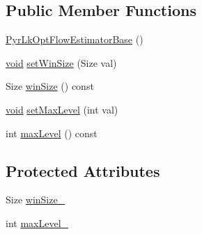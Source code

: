 \subsection*{Public Member Functions}
\begin{DoxyCompactItemize}
\item 
\hyperlink{classcv_1_1videostab_1_1PyrLkOptFlowEstimatorBase_ae6222bef78aae91f7580df19ed7217b5}{Pyr\-Lk\-Opt\-Flow\-Estimator\-Base} ()
\item 
\hyperlink{legacy_8hpp_a8bb47f092d473522721002c86c13b94e}{void} \hyperlink{classcv_1_1videostab_1_1PyrLkOptFlowEstimatorBase_aae082997b4d3af0cb5bb15cacbb44255}{set\-Win\-Size} (Size val)
\item 
Size \hyperlink{classcv_1_1videostab_1_1PyrLkOptFlowEstimatorBase_ae79a1053a09f90029e5866f39fcd6d0f}{win\-Size} () const 
\item 
\hyperlink{legacy_8hpp_a8bb47f092d473522721002c86c13b94e}{void} \hyperlink{classcv_1_1videostab_1_1PyrLkOptFlowEstimatorBase_acb6803eb86210da2474638bdeeb82789}{set\-Max\-Level} (int val)
\item 
int \hyperlink{classcv_1_1videostab_1_1PyrLkOptFlowEstimatorBase_a06716f58cecac96f6b613d7516673fc3}{max\-Level} () const 
\end{DoxyCompactItemize}
\subsection*{Protected Attributes}
\begin{DoxyCompactItemize}
\item 
Size \hyperlink{classcv_1_1videostab_1_1PyrLkOptFlowEstimatorBase_a0159fd70cd6444de1a93094b5ba73481}{win\-Size\-\_\-}
\item 
int \hyperlink{classcv_1_1videostab_1_1PyrLkOptFlowEstimatorBase_afbfdccf15125e25764a7366b1c2562ef}{max\-Level\-\_\-}
\end{DoxyCompactItemize}


